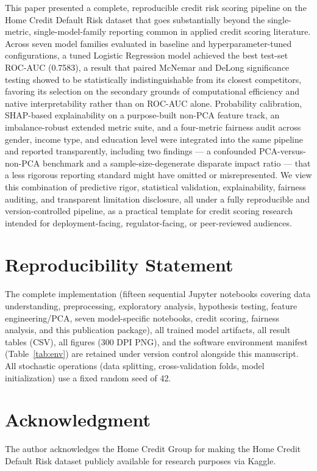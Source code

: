 \documentclass[journal]{IEEEtran}
\begin{document}
This paper presented a complete, reproducible credit risk scoring pipeline on the Home Credit Default Risk dataset that goes substantially beyond the single-metric, single-model-family reporting common in applied credit scoring literature. Across seven model families evaluated in baseline and hyperparameter-tuned configurations, a tuned Logistic Regression model achieved the best test-set ROC-AUC (0.7583), a result that paired McNemar and DeLong significance testing showed to be statistically indistinguishable from its closest competitors, favoring its selection on the secondary grounds of computational efficiency and native interpretability rather than on ROC-AUC alone. Probability calibration, SHAP-based explainability on a purpose-built non-PCA feature track, an imbalance-robust extended metric suite, and a four-metric fairness audit across gender, income type, and education level were integrated into the same pipeline and reported transparently, including two findings --- a confounded PCA-versus-non-PCA benchmark and a sample-size-degenerate disparate impact ratio --- that a less rigorous reporting standard might have omitted or misrepresented. We view this combination of predictive rigor, statistical validation, explainability, fairness auditing, and transparent limitation disclosure, all under a fully reproducible and version-controlled pipeline, as a practical template for credit scoring research intended for deployment-facing, regulator-facing, or peer-reviewed audiences.

\section*{Reproducibility Statement}

The complete implementation (fifteen sequential Jupyter notebooks covering data understanding, preprocessing, exploratory analysis, hypothesis testing, feature engineering/PCA, seven model-specific notebooks, credit scoring, fairness analysis, and this publication package), all trained model artifacts, all result tables (CSV), all figures (300 DPI PNG), and the software environment manifest (Table~\ref{tab:env}) are retained under version control alongside this manuscript. All stochastic operations (data splitting, cross-validation folds, model initialization) use a fixed random seed of 42.

\section*{Acknowledgment}
The author acknowledges the Home Credit Group for making the Home Credit Default Risk dataset publicly available for research purposes via Kaggle.
\end{document}
